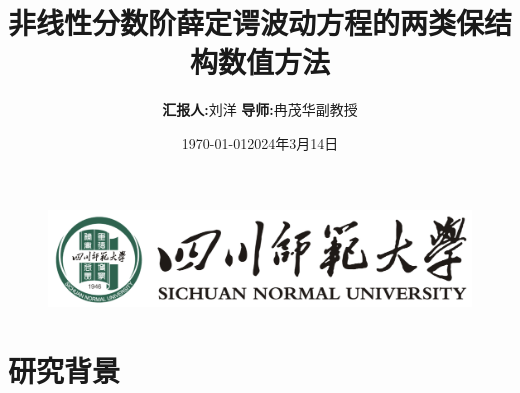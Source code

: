 \documentclass[aspectratio=169]{beamer}
\title[非线性分数阶薛定谔波动方程的两类保结构数值方法
]{非线性分数阶薛定谔波动方程的两类保结构数值方法}
\author[刘洋]{\footnotesize \textbf{汇报人:}刘洋 \quad \textbf{导师:}冉茂华\quad 副教授}
\institute[计算数学]{\footnotesize \textbf{研究方向:}偏微分方程数值解}
\date{\footnotesize \vskip -10pt \today}
\date{2024年3月14日}
\numberwithin{theorem}{section} %
\numberwithin{equation}{section}%
\numberwithin{figure}{section}%
\numberwithin{table}{section}%
\begin{document}
\kaishu
\begin{frame}
	\titlepage
	\vspace{-2mm}
	\begin{figure}[htpb]
		\begin{center}
			\includegraphics[width=0.45\linewidth]{pic/SICNU_Logo2.png}
		\end{center}
	\end{figure}
\end{frame}
\begin{frame}
\tableofcontents[sectionstyle=show,subsectionstyle=show/shaded/hide,subsubsectionstyle=show/shaded/hide]
\end{frame}

\section{研究背景}

\end{document}
